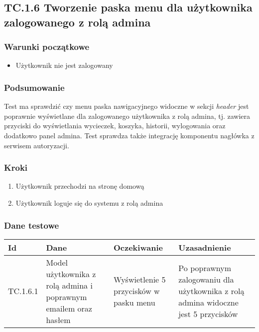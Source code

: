 \documentclass[a4paper,15pt]{article}
\begin{document}
\newpage
\begin{framed}
\subsection{TC.1.6 Tworzenie paska menu dla użytkownika zalogowanego z rolą admina}


\vspace{0.5cm}

\subsubsection{Warunki początkowe}
\begin{itemize}
\item Użytkownik nie jest zalogowany
\end{itemize}

\subsubsection{Podsumowanie}
Test ma sprawdzić czy menu paska nawigacyjnego widoczne w sekcji \textit{header} jest poprawnie wyświetlane dla zalogowanego użytkownika z rolą admina, tj. zawiera przyciski do wyświetlania wycieczek, koszyka, historii, wylogowania oraz dodatkowo panel admina.  Test sprawdza także integrację komponentu nagłówka z serwisem autoryzacji. 

\subsubsection{Kroki}
\begin{enumerate}
\item Użytkownik przechodzi na stronę domową
\item Użytkownik loguje się do systemu z rolą admina
\end{enumerate}

\subsubsection{Dane testowe}

\begin{center}
\begin{tabular}{ |C{1.5cm}|C{3cm}|C{4cm}|C{4cm}| } 
 \hline
 \textbf{Id} & \textbf{Dane} & \textbf{Oczekiwanie} & \textbf{Uzasadnienie} \\ \hline
 TC.1.6.1 & Model użytkownika z rolą admina i poprawnym emailem oraz hasłem & Wyświetlenie 5 przycisków w pasku menu & Po poprawnym zalogowaniu dla użytkownika z rolą admina widoczne jest 5 przycisków \\ \hline
\end{tabular}
\end{center}

\end{framed}
\end{document}
